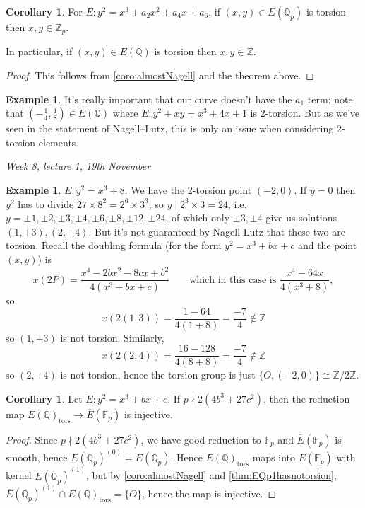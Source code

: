 \documentclass{article}
\newcommand{\F}{\mathbb{F}}
\newcommand{\Z}{\mathbb{Z}}
\newcommand{\Q}{\mathbb{Q}}
\theoremstyle{definition}
\newtheorem{coro}[defn]{Corollary}
\newtheorem{example}[defn]{Example}
\begin{document}
\begin{coro}
For $E:y^2=x^3+a_2x^2+a_4x+a_6$, if $(x,y)\in E(\Q_p)$ is torsion then $x,y\in\Z_p$.

In particular, if $(x,y)\in E(\Q)$ is torsion then $x,y\in\Z$.
\end{coro}
\begin{proof}
This follows from \ref{coro:almostNagell} and the theorem above.
\end{proof}
\begin{example}
It's really important that our curve doesn't have the $a_1$ term: note that $\left(-\frac14,\frac18\right)\in E(\Q)$ where $E:y^2+xy=x^3+4x+1$ is 2-torsion. But as we've seen in the statement of Nagell--Lutz, this is only an issue when considering 2-torsion elements.
\end{example}

\begin{flushright}
\textit{Week 8, lecture 1, 19th November}
\end{flushright}

\begin{example}
$E:y^2=x^3+8$. We have the 2-torsion point $(-2,0)$. If $y=0$ then $y^2$ has to divide $27\times 8^2=2^6\times 3^3$, so $y\mid 2^3\times 3=24$, i.e. $y=\pm 1,\pm 2,\pm 3,\pm 4,\pm 6,\pm 8,\pm 12,\pm 24$, of which only $\pm 3,\pm 4$ give us solutions $(1,\pm 3),(2,\pm 4)$. But it's not guaranteed by Nagell-Lutz that these two are torsion. Recall the doubling formula (for the form $y^2=x^3+bx+c$ and the point $(x,y)$) is
\[
x(2P)=\frac{x^4-2bx^2-8cx+b^2}{4(x^3+bx+c)}\qquad\text{which in this case is }\frac{x^4-64x}{4(x^3+8)},
\]
so
\[
x(2(1,3))=\frac{1-64}{4(1+8)}=\frac{-7}{4}\notin\Z
\]
so $(1,\pm 3)$ is not torsion. Similarly,
\[
x(2(2,4))=\frac{16-128}{4(8+8)}=\frac{-7}{4}\notin\Z
\]
so $(2,\pm 4)$ is not torsion, hence the torsion group is just $\{O,(-2,0)\}\cong\Z/2\Z$.
\end{example}

\begin{coro}
Let $E:y^2=x^3+bx+c$. If $p\nmid 2(4b^3+27c^2)$, then the reduction map $E(\Q)_{\operatorname{tors}}\rightarrow \overline E(\F_p)$ is injective.
\end{coro}
\begin{proof}
Since $p\nmid 2(4b^3+27c^2)$, we have good reduction to $\F_p$ and $\overline E(\F_p)$ is smooth, hence $E(\Q_p)^{(0)}=E(\Q_p)$. Hence $E(\Q)_{\operatorname{tors}}$ maps into $E(\F_p)$ with kernel $\overline E(\Q_p)^{(1)}$, but by \ref{coro:almostNagell} and \ref{thm:EQp1hasnotorsion}, $\overline E(\Q_p)^{(1)}\cap E(\Q)_{\operatorname{tors}}=\{O\}$, hence the map is injective.
\end{proof}
\end{document}
